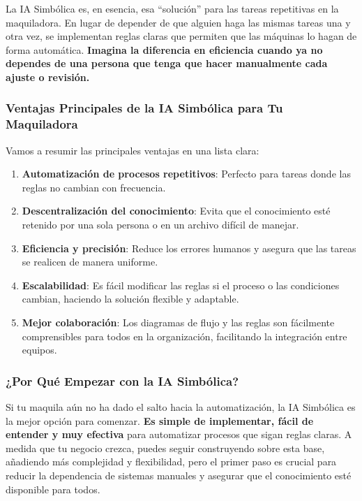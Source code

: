 \documentclass[
  10pt,
  letterpaper,
]{book}
\providecommand{\tightlist}{%
  \setlength{\itemsep}{0pt}\setlength{\parskip}{0pt}}\usepackage{longtable,booktabs,array}
\begin{document}
La IA Simbólica es, en esencia, esa ``solución'' para las tareas
repetitivas en la maquiladora. En lugar de depender de que alguien haga
las mismas tareas una y otra vez, se implementan reglas claras que
permiten que las máquinas lo hagan de forma automática. \textbf{Imagina
la diferencia en eficiencia cuando ya no dependes de una persona que
tenga que hacer manualmente cada ajuste o revisión.}

\subsubsection{Ventajas Principales de la IA Simbólica para Tu
Maquiladora}\label{ventajas-principales-de-la-ia-simbuxf3lica-para-tu-maquiladora}

Vamos a resumir las principales ventajas en una lista clara:

\begin{enumerate}
\def\labelenumi{\arabic{enumi}.}
\tightlist
\item
  \textbf{Automatización de procesos repetitivos}: Perfecto para tareas
  donde las reglas no cambian con frecuencia.
\item
  \textbf{Descentralización del conocimiento}: Evita que el conocimiento
  esté retenido por una sola persona o en un archivo difícil de manejar.
\item
  \textbf{Eficiencia y precisión}: Reduce los errores humanos y asegura
  que las tareas se realicen de manera uniforme.
\item
  \textbf{Escalabilidad}: Es fácil modificar las reglas si el proceso o
  las condiciones cambian, haciendo la solución flexible y adaptable.
\item
  \textbf{Mejor colaboración}: Los diagramas de flujo y las reglas son
  fácilmente comprensibles para todos en la organización, facilitando la
  integración entre equipos.
\end{enumerate}

\subsubsection{¿Por Qué Empezar con la IA
Simbólica?}\label{por-quuxe9-empezar-con-la-ia-simbuxf3lica}

Si tu maquila aún no ha dado el salto hacia la automatización, la IA
Simbólica es la mejor opción para comenzar. \textbf{Es simple de
implementar, fácil de entender y muy efectiva} para automatizar procesos
que sigan reglas claras. A medida que tu negocio crezca, puedes seguir
construyendo sobre esta base, añadiendo más complejidad y flexibilidad,
pero el primer paso es crucial para reducir la dependencia de sistemas
manuales y asegurar que el conocimiento esté disponible para todos.
\end{document}
